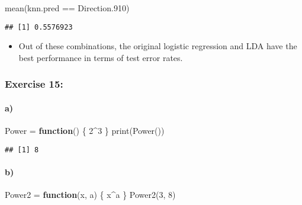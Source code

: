 \documentclass[
]{article}
\newenvironment{Shaded}{\begin{snugshade}}{\end{snugshade}}
\newcommand{\ControlFlowTok}[1]{\textcolor[rgb]{0.13,0.29,0.53}{\textbf{#1}}}
\newcommand{\DecValTok}[1]{\textcolor[rgb]{0.00,0.00,0.81}{#1}}
\newcommand{\FloatTok}[1]{\textcolor[rgb]{0.00,0.00,0.81}{#1}}
\newcommand{\FunctionTok}[1]{\textcolor[rgb]{0.00,0.00,0.00}{#1}}
\newcommand{\NormalTok}[1]{#1}
\newcommand{\OtherTok}[1]{\textcolor[rgb]{0.56,0.35,0.01}{#1}}
\newcommand{\SpecialCharTok}[1]{\textcolor[rgb]{0.00,0.00,0.00}{#1}}
\providecommand{\tightlist}{%
  \setlength{\itemsep}{0pt}\setlength{\parskip}{0pt}}
\begin{document}
\begin{Shaded}
\begin{Highlighting}[]
\FunctionTok{mean}\NormalTok{(knn.pred }\SpecialCharTok{==}\NormalTok{ Direction}\FloatTok{.910}\NormalTok{)}
\end{Highlighting}
\end{Shaded}

\begin{verbatim}
## [1] 0.5576923
\end{verbatim}

\begin{itemize}
\tightlist
\item
  Out of these combinations, the original logistic regression and LDA
  have the best performance in terms of test error rates.
\end{itemize}

\hypertarget{exercise-15}{%
\subsubsection{Exercise 15:}\label{exercise-15}}

\hypertarget{a-1}{%
\paragraph{a)}\label{a-1}}

\begin{Shaded}
\begin{Highlighting}[]
\NormalTok{Power }\OtherTok{=} \ControlFlowTok{function}\NormalTok{() \{}
    \DecValTok{2}\SpecialCharTok{\^{}}\DecValTok{3}
\NormalTok{\}}
\FunctionTok{print}\NormalTok{(}\FunctionTok{Power}\NormalTok{())}
\end{Highlighting}
\end{Shaded}

\begin{verbatim}
## [1] 8
\end{verbatim}

\hypertarget{b-1}{%
\paragraph{b)}\label{b-1}}

\begin{Shaded}
\begin{Highlighting}[]
\NormalTok{Power2 }\OtherTok{=} \ControlFlowTok{function}\NormalTok{(x, a) \{}
\NormalTok{    x}\SpecialCharTok{\^{}}\NormalTok{a}
\NormalTok{\}}
\FunctionTok{Power2}\NormalTok{(}\DecValTok{3}\NormalTok{, }\DecValTok{8}\NormalTok{)}
\end{Highlighting}
\end{Shaded}
\end{document}
